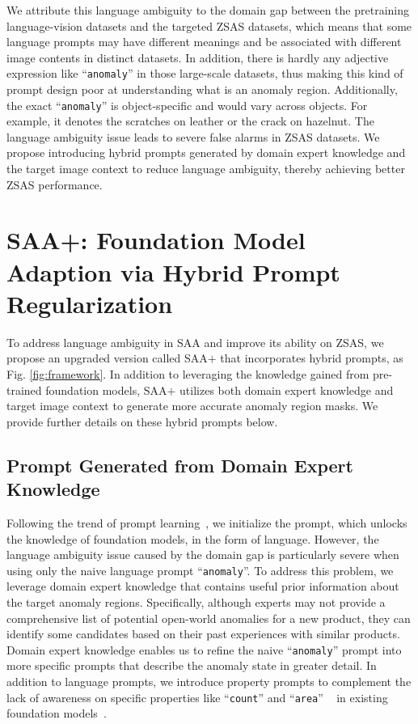 \documentclass{article}
\begin{document}
We attribute this language ambiguity to the domain gap between the pretraining language-vision datasets and the targeted ZSAS datasets, which means that some language prompts may have different meanings and be associated with different image contents in distinct datasets. In addition, there is hardly any adjective expression like ``\verb|anomaly|'' in those large-scale datasets, thus making this kind of prompt design poor at understanding what is an anomaly region. Additionally, the exact ``\verb|anomaly|'' is object-specific and would vary across objects. For example, it denotes the scratches on leather or the crack on hazelnut. The language ambiguity issue leads to severe false alarms in ZSAS datasets. We propose introducing hybrid prompts generated by domain expert knowledge and the target image context to reduce language ambiguity, thereby achieving better ZSAS performance. 

\section{SAA+: Foundation Model Adaption via Hybrid Prompt Regularization}
\label{sec:method}  

To address language ambiguity in SAA and improve its ability on ZSAS, we propose an upgraded version called SAA$+$ that incorporates hybrid prompts, as Fig. \ref{fig:framework}. In addition to leveraging the knowledge gained from pre-trained foundation models, SAA$+$ utilizes both domain expert knowledge and target image context to generate more accurate anomaly region masks. We provide further details on these hybrid prompts below.

\subsection{Prompt Generated from Domain Expert Knowledge}

Following the trend of prompt learning~\cite{zhou_conditional,zhou_learning_2022}, we initialize the prompt, which unlocks the knowledge of foundation models, in the form of language. However, the language ambiguity issue caused by the domain gap is particularly severe when using only the naive language prompt ``\verb|anomaly|''. To address this problem, we leverage domain expert knowledge that contains useful prior information about the target anomaly regions. Specifically, although experts may not provide a comprehensive list of potential open-world anomalies for a new product, they can identify some candidates based on their past experiences with similar products. Domain expert knowledge enables us to refine the naive ``\verb|anomaly|'' prompt into more specific prompts that describe the anomaly state in greater detail. In addition to language prompts, we introduce property prompts to complement the lack of awareness on specific properties like ``\verb|count|'' and ``\verb|area|'' ~\cite{paiss_count_2023} in existing foundation models~\cite{paiss_count_2023}.
\end{document}
